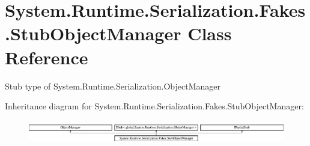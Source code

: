 \hypertarget{class_system_1_1_runtime_1_1_serialization_1_1_fakes_1_1_stub_object_manager}{\section{System.\-Runtime.\-Serialization.\-Fakes.\-Stub\-Object\-Manager Class Reference}
\label{class_system_1_1_runtime_1_1_serialization_1_1_fakes_1_1_stub_object_manager}
}


Stub type of System.\-Runtime.\-Serialization.\-Object\-Manager 


Inheritance diagram for System.\-Runtime.\-Serialization.\-Fakes.\-Stub\-Object\-Manager\-:\begin{figure}[H]
\begin{center}
\leavevmode
\includegraphics[height=1.028466cm]{class_system_1_1_runtime_1_1_serialization_1_1_fakes_1_1_stub_object_manager}
\end{center}
\end{figure}
